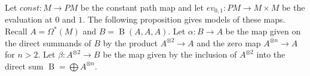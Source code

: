 \documentclass{scrartcl}
\theoremstyle{plain}
\theoremstyle{definition}
\newtheorem{remark}[theorem]{Remark}
\let\xto\xrightarrow
\DeclareMathOperator{\id}{id}
\DeclareMathOperator{\BC}{B}
\begin{document}



Let $const\colon M\to PM$ be the constant path map and let $ev_{0,1}\colon PM\to M\times M$ be the evaluation at $0$ and $1$. The following proposition gives models of these maps. Recall $A=\Omega^*(M)$ and $B = \BC(A, A, A)$. Let $\alpha\colon B\to A$ be the map given on the direct summands of $B$ by the product $A^{\otimes 2}\to A$ and the zero map $A^{\otimes n}\to A$ for $n>2$. Let $\beta\colon A^{\otimes 2}\to B$ be the map given by the inclusion of $A^{\otimes 2}$ into the direct sum $\BC = \bigoplus A^{\otimes n}$.
\end{document}
